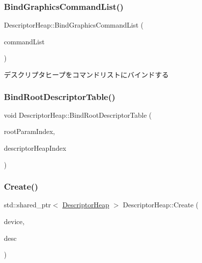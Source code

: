 \subsubsection{\texorpdfstring{Bind\+Graphics\+Command\+List()}{BindGraphicsCommandList()}}
{\footnotesize\ttfamily Descriptor\+Heap\+::\+Bind\+Graphics\+Command\+List (\begin{DoxyParamCaption}\item[{Com\+Ptr$<$ I\+D3\+D12\+Graphics\+Command\+List $>$}]{command\+List }\end{DoxyParamCaption})}

デスクリプタヒープをコマンドリストにバインドする \mbox{\label{class_descriptor_heap_a8580bf420ca41fd262793680d5676524}} 
\subsubsection{\texorpdfstring{Bind\+Root\+Descriptor\+Table()}{BindRootDescriptorTable()}}
{\footnotesize\ttfamily void Descriptor\+Heap\+::\+Bind\+Root\+Descriptor\+Table (\begin{DoxyParamCaption}\item[{int}]{root\+Param\+Index,  }\item[{int}]{descriptor\+Heap\+Index }\end{DoxyParamCaption})}

\mbox{\label{class_descriptor_heap_aae33b8a5c2d8e825ba93c14c99a141c8}} 
\subsubsection{\texorpdfstring{Create()}{Create()}\hspace{0.1cm}{\footnotesize\ttfamily [1/2]}}
{\footnotesize\ttfamily std\+::shared\+\_\+ptr$<$ \mbox{\hyperlink{class_descriptor_heap}{Descriptor\+Heap}} $>$ Descriptor\+Heap\+::\+Create (\begin{DoxyParamCaption}\item[{Com\+Ptr$<$ I\+D3\+D12\+Device $>$}]{device,  }\item[{const D3\+D12\+\_\+\+D\+E\+S\+C\+R\+I\+P\+T\+O\+R\+\_\+\+H\+E\+A\+P\+\_\+\+D\+E\+SC \&}]{desc }\end{DoxyParamCaption})\hspace{0.3cm}{\ttfamily [static]}}

